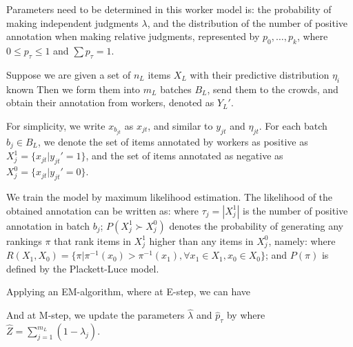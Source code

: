 Parameters need to be determined in this worker model is:
the probability of making independent judgments $\lambda$, 
and the distribution of the number of positive annotation when making relative judgments, 
represented by $p_0, \ldots, p_k$, where $0 \leq p_{\tau} \leq 1$ and $\sum p_{\tau} = 1$.  

Suppose we are given a set of $n_L$ items $X_L$ with their predictive distribution $\eta_i$ known %
Then we form them into $m_L$ batches $B_L$, send them to the crowds, 
and obtain their annotation from workers, denoted as $Y_L'$.  


For simplicity, we write $x_{b_{jt}}$ as $x_{jt}$, and similar to $y_{jt}$ and $\eta_{jt}$.
For each batch $b_j \in B_L$, we denote the set of items annotated by workers as positive as $X_{j}^1 = \{x_{jt} | y_{jt}' = 1\}$, 
and the set of items annotated as negative as $X_{j}^0 = \{x_{jt} | y_{jt}' = 0\}$.  


We train the model by maximum likelihood estimation.  
The likelihood of the obtained annotation can be written as:
%
where $\tau_j = |X_{j}^1|$ is the number of positive annotation in batch $b_j$;
$P(X_{j}^1 \succ X_{j}^0)$ denotes the probability of generating any rankings $\pi$
that rank items in $X_{j}^1$ higher than any items in $X_{j}^0$, 
namely:
%
where $R(X_1, X_0) = \{ \pi |\pi^{-1}(x_{0}) > \pi^{-1}(x_{1}),  \forall x_{1} \in X_1, x_0 \in X_0 \}$;
and $P(\pi)$ is defined by the Plackett-Luce model.  

Applying an EM-algorithm, where at E-step, we can have 

And at M-step, we update the parameters $\hat{\lambda}$ and $\hat{p}_{\tau}$ by
%
where $\hat{Z} = \sum_{j=1}^{m_L} (1 - \hat{\lambda}_j)$.  


